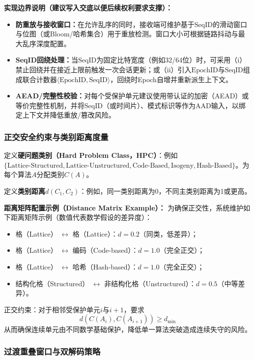\documentclass[12pt,a4paper]{article}
\begin{document}
	\textbf{实现边界说明（建议写入交底以便后续权利要求支撑）：}
\begin{itemize}
    \item \textbf{防重放与接收窗口：}在允许乱序的同时，接收端可维护基于$\text{SeqID}$的滑动窗口与位图（或Bloom/哈希集合）用于重放检测。窗口大小可根据链路抖动与最大乱序深度配置。
    \item \textbf{SeqID回绕处理：}当$\text{SeqID}$为固定比特宽度（例如32/64位）时，可采用（i）禁止回绕并在接近上限前触发一次会话更新；或（ii）引入$\text{EpochID}$与$\text{SeqID}$组成联合计数器$\langle\text{EpochID},\text{SeqID}\rangle$，回绕时Epoch自增并重新派生上下文。
    \item \textbf{AEAD/完整性校验：}对每个受保护单元建议使用带认证的加密（AEAD）或等价完整性机制，并将$\text{SeqID}$（或时间片）、模式标识等作为AAD输入，以绑定上下文并降低重放/篡改风险。
\end{itemize}

\subsubsection{正交安全约束与类别距离度量}

定义\textbf{硬问题类别（Hard Problem Class，HPC）}：例如 $\{\text{Lattice-Structured}, \text{Lattice-Unstructured}, \text{Code-Based}, \text{Isogeny}, \text{Hash-Based}\}$。为每个算法$A$分配类别$C(A)$。

定义\textbf{类别距离}$d(C_1,C_2)$：例如，同一类别距离为0，不同主类别距离为1或更高。

\textbf{距离矩阵配置示例（Distance Matrix Example）：}
为确保正交性，系统维护如下距离矩阵示例（数值代表数学假设的差异度）：
\begin{itemize}
    \item 格（Lattice） $\leftrightarrow$ 格（Lattice）：$d = 0.2$（同类，低差异）；
    \item 格（Lattice） $\leftrightarrow$ 编码（Code-based）：$d = 1.0$（完全正交）；
    \item 格（Lattice） $\leftrightarrow$ 哈希（Hash-based）：$d = 1.0$（完全正交）；
    \item 结构化格（Structured） $\leftrightarrow$ 非结构化格（Unstructured）：$d = 0.5$（中等差异）。
\end{itemize}

正交约束：对于相邻受保护单元$i$与$i+1$，要求
\[
d(C(A_i), C(A_{i+1})) \geq d_{\min}
\]
从而确保连续单元由不同数学基础保护，降低单一算法突破造成连续失守的风险。

\subsubsection{过渡重叠窗口与双解码策略}
\end{document}
